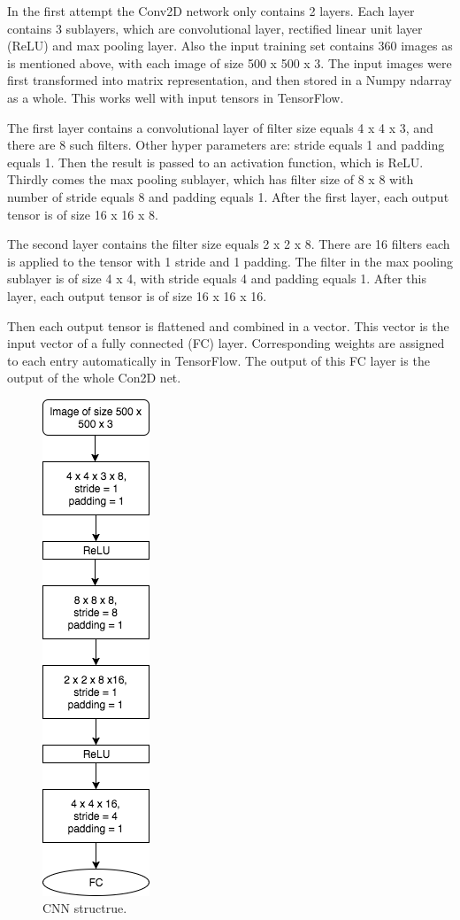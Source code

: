 \documentclass{article}
\begin{document}
In the first attempt the Conv2D network only contains 2 layers. Each layer contains 3 sublayers, which are convolutional layer, rectified linear unit layer (ReLU) and max pooling layer. Also the input training set contains 360 images as is mentioned above, with each image of size 500 x 500 x 3. The input images were first transformed into matrix representation, and then stored in a Numpy ndarray as a whole. This works well with input tensors in TensorFlow.

The first layer contains a convolutional layer of filter size equals 4 x 4 x 3, and there are 8 such filters. Other hyper parameters are: stride equals 1 and padding equals 1. Then the result is passed to an activation function, which is ReLU. Thirdly comes the max pooling sublayer, which has filter size of 8 x 8 with number of stride equals 8 and padding equals 1. After the first layer, each output tensor is of size 16 x 16 x 8.

The second layer contains the filter size equals 2 x 2 x 8. There are 16 filters each is applied to the tensor with 1 stride and 1 padding. The filter in the max pooling sublayer is of size 4 x 4, with stride equals 4 and padding equals 1. After this layer, each output tensor is of size 16 x 16 x 16.

Then each output tensor is flattened and combined in a vector. This vector is the input vector of a fully connected (FC) layer. Corresponding weights are assigned to each entry automatically in TensorFlow. The output of this FC layer is the output of the whole Con2D net.



\begin{figure}[ht]
  \centering
  \includegraphics[width=0.2\linewidth]{cnn_structrue_1.png}
  \caption{CNN structrue.}
  \label{cnn_structrue_1}
\end{figure}
\end{document}
